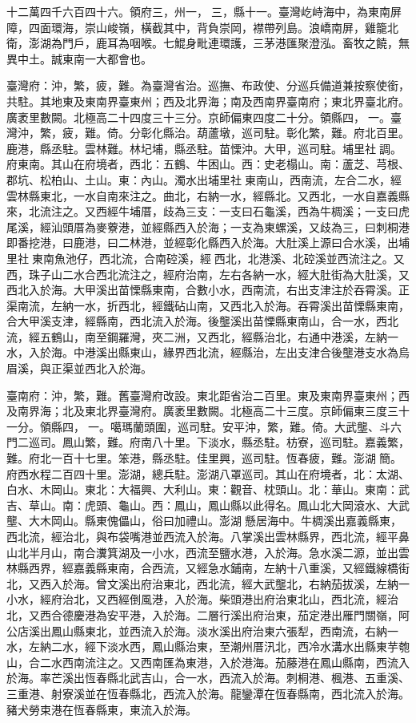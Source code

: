 \begin{pinyinscope}
十二萬四千六百四十六。領府三，州一，三，縣十一。臺灣屹峙海中，為東南屏障，四面環海，崇山峻嶺，橫截其中，背負崇岡，襟帶列島。浪嶠南屏，雞籠北衛，澎湖為門戶，鹿耳為咽喉。七鯤身毗連環護，三茅港匯聚澄泓。畜牧之饒，無異中土。誠東南一大都會也。

臺灣府：沖，繁，疲，難。為臺灣省治。巡撫、布政使、分巡兵備道兼按察使銜，共駐。其地東及東南界臺東州；西及北界海；南及西南界臺南府；東北界臺北府。廣袤里數闕。北極高二十四度三十三分。京師偏東四度二十分。領縣四，一。臺灣沖，繁，疲，難。倚。分彰化縣治。葫蘆墩，巡司駐。彰化繁，難。府北百里。鹿港，縣丞駐。雲林難。林圮埔，縣丞駐。苗慄沖。大甲，巡司駐。埔里社調。府東南。其山在府境者，西北：五鶴、牛困山。西：史老榻山。南：蘆芝、芎根、郡坑、松柏山、土山。東：內山。濁水出埔里社東南山，西南流，左合二水，經雲林縣東北，一水自南來注之。曲北，右納一水，經縣北。又西北，一水自嘉義縣來，北流注之。又西經牛埔厝，歧為三支：一支曰石龜溪，西為牛椆溪；一支曰虎尾溪，經汕頭厝為麥藔港，並經縣西入於海；一支為東螺溪，又歧為三，曰刺桐港即番挖港，曰鹿港，曰二林港，並經彰化縣西入於海。大肚溪上源曰合水溪，出埔里社東南魚池仔，西北流，合南硿溪，經西北，北港溪、北硿溪並西流注之。又西，珠子山二水合西北流注之，經府治南，左右各納一水，經大肚街為大肚溪，又西北入於海。大甲溪出苗慄縣東南，合數小水，西南流，右出支津注於吞霄溪。正渠南流，左納一水，折西北，經鐵砧山南，又西北入於海。吞霄溪出苗慄縣東南，合大甲溪支津，經縣南，西北流入於海。後壟溪出苗慄縣東南山，合一水，西北流，經五鶴山，南至鋼羅灣，夾二洲，又西北，經縣治北，右通中港溪，左納一水，入於海。中港溪出縣東山，緣界西北流，經縣治，左出支津合後壟港支水為烏眉溪，與正渠並西北入於海。

臺南府：沖，繁，難。舊臺灣府改設。東北距省治二百里。東及東南界臺東州；西及南界海；北及東北界臺灣府。廣袤里數闕。北極高二十三度。京師偏東三度三十一分。領縣四，一。噶瑪蘭頭圍，巡司駐。安平沖，繁，難。倚。大武壟、斗六門二巡司。鳳山繁，難。府南八十里。下淡水，縣丞駐。枋寮，巡司駐。嘉義繁，難。府北一百十七里。笨港，縣丞駐。佳里興，巡司駐。恆春疲，難。澎湖簡。府西水程二百四十里。澎湖，總兵駐。澎湖八罩巡司。其山在府境者，北：太湖、白水、木岡山。東北：大福興、大利山。東：觀音、枕頭山。北：華山。東南：武吉、草山。南：虎頭、龜山。西：鳳山，鳳山縣以此得名。鳳山北大岡滾水、大武壟、大木岡山。縣東傀儡山，俗曰加禮山。澎湖懸居海中。牛椆溪出嘉義縣東，西北流，經治北，與布袋嘴港並西流入於海。八掌溪出雲林縣界，西北流，經平鼻山北半月山，南合瀵箕湖及一小水，西流至鹽水港，入於海。急水溪二源，並出雲林縣西界，經嘉義縣東南，合西流，又經急水鋪南，左納十八重溪，又經鐵線橋街北，又西入於海。曾文溪出府治東北，西北流，經大武壟北，右納茄拔溪，左納一小水，經府治北，又西經倒風港，入於海。柴頭港出府治東北山，西北流，經治北，又西合德慶港為安平港，入於海。二層行溪出府治東，茄定港出雁門關嶺，阿公店溪出鳳山縣東北，並西流入於海。淡水溪出府治東六張犁，西南流，右納一水，左納二水，經下淡水西，鳳山縣治東，至潮州厝汛北，西冷水溝水出縣東芋匏山，合二水西南流注之。又西南匯為東港，入於港海。茄藤港在鳳山縣南，西流入於海。率芒溪出恆春縣北武吉山，合一水，西流入於海。刺桐港、楓港、五重溪、三重港、射寮溪並在恆春縣北，西流入於海。龍鑾潭在恆春縣南，西北流入於海。豬犬勞束港在恆春縣東，東流入於海。


\end{pinyinscope}
